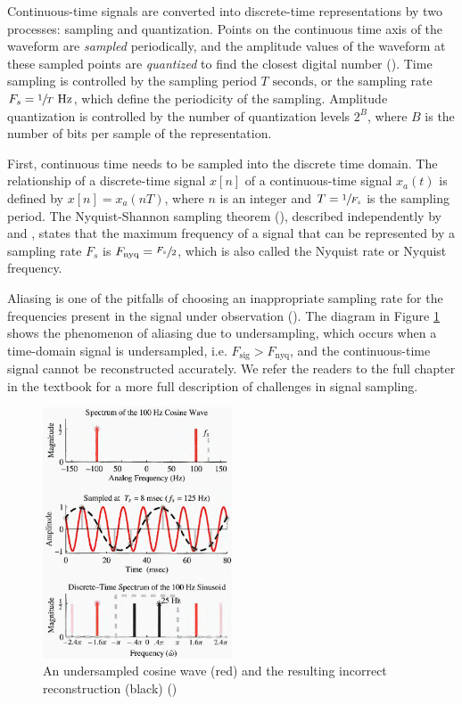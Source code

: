 \documentclass[report.tex]{subfiles}
\begin{document}
Continuous-time signals are converted into discrete-time representations by two processes: sampling and quantization. Points on the continuous time axis of the waveform are \textit{sampled} periodically, and the amplitude values of the waveform at these sampled points are \textit{quantized} to find the closest digital number (\cite{melbook}). Time sampling is controlled by the sampling period $T \text{ seconds}$, or the sampling rate $F_{s} = \sfrac{1}{T} \text{ Hz}$, which define the periodicity of the sampling. Amplitude quantization is controlled by the number of quantization levels $2^{B}$, where $B$ is the number of bits per sample of the representation.

First, continuous time needs to be sampled into the discrete time domain. The relationship of a discrete-time signal $x[n]$ of a continuous-time signal $x_{a}(t)$ is defined by $x[n] = x_{a}(nT)$, where $n$ is an integer and $T = \sfrac{1}{F_{s}}$ is the sampling period. The Nyquist-Shannon sampling theorem (\cite{discretebook}), described independently by \textcite{nyquist1928} and \textcite{shannon1948}, states that the maximum frequency of a signal that can be represented by a sampling rate $F_{s}$ is $F_{\text{nyq}} = \sfrac{F_{s}}{2}$, which is also called the Nyquist rate or Nyquist frequency.

Aliasing is one of the pitfalls of choosing an inappropriate sampling rate for the frequencies present in the signal under observation (\cite{dspfirst}). The diagram in Figure \ref{fig:aliasing} shows the phenomenon of aliasing due to undersampling, which occurs when a time-domain signal is undersampled, i.e. $F_{\text{sig}} > F_{\text{nyq}}$, and the continuous-time signal cannot be reconstructed accurately. We refer the readers to the full chapter in the textbook for a more full description of challenges in signal sampling.

\begin{figure}[ht]
	\centering
	\includegraphics[width=0.5\textwidth]{./images-tftheory/aliasing_undersampling.png}
	\caption{An undersampled cosine wave (red) and the resulting incorrect reconstruction (black) (\cite[82]{dspfirst})}
	\label{fig:aliasing}
\end{figure}
\end{document}
